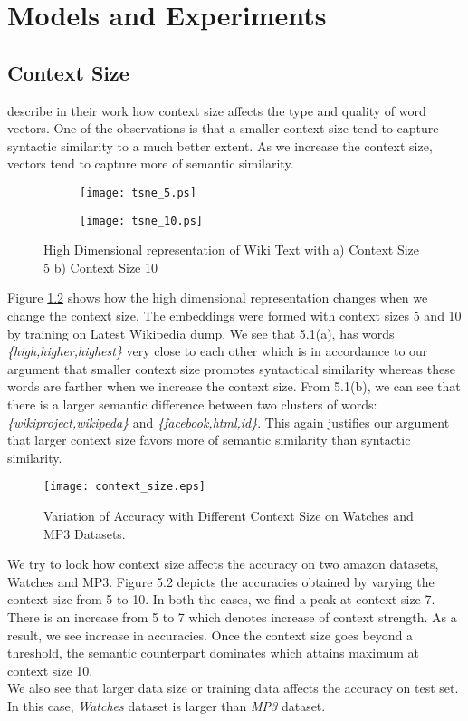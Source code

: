 \chapter{Models and Experiments}
\label{sec:experiment}
\section{Context Size}
\cite{Mikolov:13a} describe in their work how context size affects the type and quality of word vectors. One of the observations is that a smaller context size tend to capture syntactic similarity to a much better extent. As we increase the context size, vectors tend to capture more of semantic similarity.
\begin{figure}[]
	\centering
	\begin{subfigure}{\linewidth}
	\texttt{[image: tsne\_5.ps]}
	\caption{}
	\label{fig:5K_hindi_zoom1}
	\end{subfigure}
	\newline
	\begin{subfigure}{\linewidth}
	\texttt{[image: tsne\_10.ps]}
	\caption{}
	\end{subfigure}
	\newline
	\caption{High Dimensional representation of Wiki Text with a) Context Size 5 b) Context Size 10}
	\label{fig:tsne_5_10}
\end{figure}

Figure \ref{fig:tsne_5_10} shows how the high dimensional representation changes when we change the context size. The embeddings were formed with context sizes 5 and 10 by training on Latest Wikipedia dump. We see that 5.1(a), has words \emph{\{high,higher,highest\}} very close to each other which is in accordamce to our argument that smaller context size promotes syntactical similarity whereas these words are farther when we increase the context size. From 5.1(b), we can see that there is a larger semantic difference between two clusters of words:\emph{\{wikiproject,wikipeda\}} and \emph{\{facebook,html,id\}}. This again justifies our argument that larger context size favors more of semantic similarity than syntactic similarity.

\begin{figure}[ht!]
\centering
\texttt{[image: context\_size.eps]}
\caption{Variation of Accuracy with Different Context Size on Watches and MP3 Datasets. \label{fig:context_size}}
\end{figure}
We try to look how context size affects the accuracy on two amazon datasets, Watches and MP3.
Figure 5.2 depicts the accuracies obtained by varying the context size from 5 to 10. In both the cases, we find a peak at context size 7. There is an increase from 5 to 7 which denotes increase of context strength. As a result, we see increase in accuracies. Once the context size goes beyond a threshold, the semantic counterpart dominates which attains maximum at context size 10.\\
We also see that larger data size or training data affects the accuracy on test set. In this case, \emph{Watches} dataset is larger than \emph{MP3} dataset.\\


